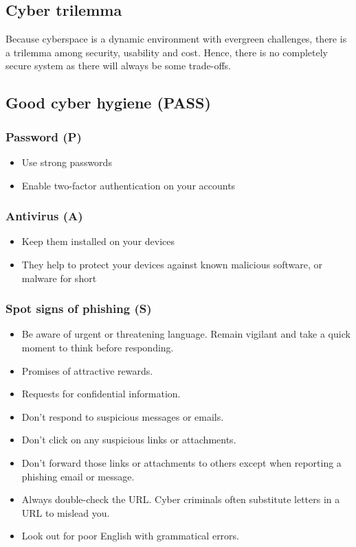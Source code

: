 \documentclass[11pt]{article}
\begin{document}
\subsection{Cyber trilemma}
\label{sec:orgf7624d5}
Because cyberspace is a dynamic environment with evergreen challenges, there is a trilemma among security, usability and cost. Hence, there is no completely secure system as there will always be some trade-offs.
\subsection{Good cyber hygiene (PASS)}
\label{sec:org92ff467}

\subsubsection{Password (P)}
\label{sec:orga1308c5}
\begin{itemize}
\item Use strong passwords
\item Enable two-factor authentication on your accounts
\end{itemize}
\subsubsection{Antivirus (A)}
\label{sec:orgf38c04c}
\begin{itemize}
\item Keep them installed on your devices
\item They help to protect your devices against known malicious software, or malware for short
\end{itemize}
\subsubsection{Spot signs of phishing (S)}
\label{sec:orgbe8ca86}
\begin{itemize}
\item Be aware of urgent or threatening language. Remain vigilant and take a quick moment to think before responding.
\item Promises of attractive rewards.
\item Requests for confidential information.
\item Don't respond to suspicious messages or emails.
\item Don't click on any suspicious links or attachments.
\item Don't forward those links or attachments to others except when reporting a phishing email or message.
\item Always double-check the URL. Cyber criminals often substitute letters in a URL to mislead you.
\item Look out for poor English with grammatical errors.
\end{itemize}
\end{document}
